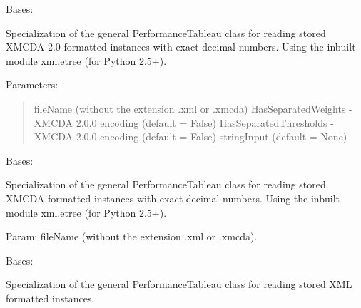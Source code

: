 \documentclass[letterpaper,10pt,english]{sphinxmanual}
\begin{document}

\begin{fulllineitems}
\label{techDoc:perfTabs.XMCDA2PerformanceTableau}
Bases: {\hyperref[techDoc:perfTabs.PerformanceTableau]{}}

Specialization of the general PerformanceTableau class for reading
stored XMCDA 2.0 formatted instances with exact decimal numbers.
Using the inbuilt module xml.etree (for Python 2.5+).

Parameters:
\begin{quote}

fileName (without the extension .xml or .xmcda)
HasSeparatedWeights - XMCDA 2.0.0 encoding (default = False)
HasSeparatedThresholds - XMCDA 2.0.0 encoding (default = False)
stringInput (default = None)
\end{quote}

\end{fulllineitems}


\begin{fulllineitems}
\label{techDoc:perfTabs.XMCDAPerformanceTableau}
Bases: {\hyperref[techDoc:perfTabs.PerformanceTableau]{}}

Specialization of the general PerformanceTableau class for reading
stored XMCDA formatted instances with exact decimal numbers.
Using the inbuilt module
xml.etree (for Python 2.5+).

Param: fileName (without the extension .xml or .xmcda).

\end{fulllineitems}


\begin{fulllineitems}
\label{techDoc:perfTabs.XMLPerformanceTableau}
Bases: {\hyperref[techDoc:perfTabs.PerformanceTableau]{}}

Specialization of the general PerformanceTableau class for reading
stored XML formatted instances.

\end{fulllineitems}
\end{document}
